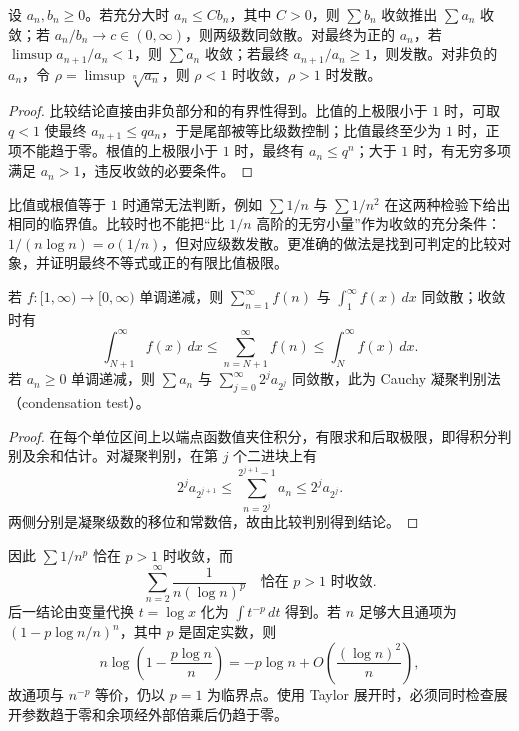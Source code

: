 \begin{theorem}[比较、比值与根值判别]
\label{thm:pei-positive-tests}
设 $a_n,b_n\geq0$。若充分大时 $a_n\leq Cb_n$，其中 $C>0$，则 $\sum b_n$ 收敛推出 $\sum a_n$ 收敛；若 $a_n/b_n\to c\in(0,\infty)$，则两级数同敛散。对最终为正的 $a_n$，若 $\limsup a_{n+1}/a_n<1$，则 $\sum a_n$ 收敛；若最终 $a_{n+1}/a_n\geq1$，则发散。对非负的 $a_n$，令 $\rho=\limsup\sqrt[n]{a_n}$，则 $\rho<1$ 时收敛，$\rho>1$ 时发散。
\end{theorem}
\begin{proof}
比较结论直接由非负部分和的有界性得到。比值的上极限小于 $1$ 时，可取 $q<1$ 使最终 $a_{n+1}\leq qa_n$，于是尾部被等比级数控制；比值最终至少为 $1$ 时，正项不能趋于零。根值的上极限小于 $1$ 时，最终有 $a_n\leq q^n$；大于 $1$ 时，有无穷多项满足 $a_n>1$，违反收敛的必要条件。
\end{proof}

比值或根值等于 $1$ 时通常无法判断，例如 $\sum1/n$ 与 $\sum1/n^2$ 在这两种检验下给出相同的临界值。比较时也不能把“比 $1/n$ 高阶的无穷小量”作为收敛的充分条件：$1/(n\log n)=o(1/n)$，但对应级数发散。更准确的做法是找到可判定的比较对象，并证明最终不等式或正的有限比值极限。

\begin{theorem}[积分判别法与凝聚判别法]
\label{thm:pei-integral-condensation}
若 $f:[1,\infty)\to[0,\infty)$ 单调递减，则 $\sum_{n=1}^{\infty}f(n)$ 与 $\int_1^{\infty}f(x)\,dx$ 同敛散；收敛时有
\begin{equation}
 \int_{N+1}^{\infty}f(x)\,dx
 \leq\sum_{n=N+1}^{\infty}f(n)
 \leq\int_N^{\infty}f(x)\,dx.
 \label{eq:pei-integral-tail}
\end{equation}
若 $a_n\geq0$ 单调递减，则 $\sum a_n$ 与 $\sum_{j=0}^{\infty}2^ja_{2^j}$ 同敛散，此为 Cauchy 凝聚判别法（condensation test）。
\end{theorem}
\begin{proof}
在每个单位区间上以端点函数值夹住积分，有限求和后取极限，即得积分判别及余和估计。对凝聚判别，在第 $j$ 个二进块上有
\[
 2^ja_{2^{j+1}}\leq\sum_{n=2^j}^{2^{j+1}-1}a_n\leq2^ja_{2^j}.
\]
两侧分别是凝聚级数的移位和常数倍，故由比较判别得到结论。
\end{proof}

因此 $\sum1/n^p$ 恰在 $p>1$ 时收敛，而
\[
 \sum_{n=2}^{\infty}\frac1{n(\log n)^p}
 \quad\text{恰在 }p>1\text{ 时收敛}.
\]
后一结论由变量代换 $t=\log x$ 化为 $\int t^{-p}\,dt$ 得到。若 $n$ 足够大且通项为 $(1-p\log n/n)^n$，其中 $p$ 是固定实数，则
\[
 n\log\!\left(1-\frac{p\log n}{n}\right)
 =-p\log n+O\!\left(\frac{(\log n)^2}{n}\right),
\]
故通项与 $n^{-p}$ 等价，仍以 $p=1$ 为临界点。使用 Taylor 展开时，必须同时检查展开参数趋于零和余项经外部倍乘后仍趋于零。

